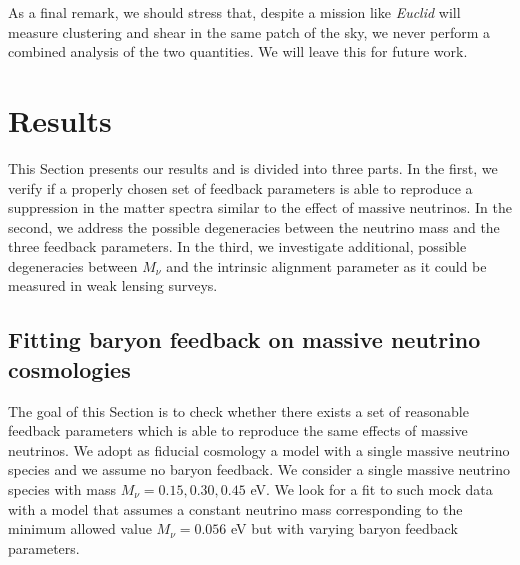 \documentclass[a4paper,11pt]{article}
\begin{document}
As a final remark, we should stress that, despite a mission like \textit{Euclid} will measure clustering and shear in the same patch of the sky, we never perform a combined analysis of the two quantities. We will leave this for future work.


\section{Results}
\label{sec:results}

This Section presents our results and is divided into three parts.
In the first, we verify if a properly chosen set of feedback parameters is able to reproduce a suppression in the matter spectra similar to the effect of  massive neutrinos. In the second, we address the possible degeneracies between the neutrino mass and the three feedback parameters. In the third, we investigate additional, possible degeneracies between $M_\nu$ and the intrinsic alignment parameter as it could be measured in weak lensing surveys.


\subsection{Fitting baryon feedback on massive neutrino cosmologies}
\label{sec:feedback_on_nu}

The goal of this Section is to check whether there exists a set of reasonable feedback parameters which is able to reproduce the same effects of massive neutrinos.
We adopt as fiducial cosmology a model with a single massive neutrino species and we assume no baryon feedback.
We consider a single massive neutrino species with mass $M_\nu = 0.15, 0.30, 0.45$ eV. 
We look for a fit to such mock data with a model that assumes a constant neutrino mass corresponding to the minimum allowed value $M_\nu = 0.056$ eV \cite{LP_massive_nu+06} but with varying baryon feedback parameters. 
\end{document}
